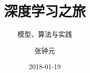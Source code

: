 \title[深度学习之旅]
{深度学习之旅}

\subtitle{模型、算法与实践}

\author[张钟元]
{ 张钟元
}

\institute[]
{
}

\date[2018.10]{2018-01-19}
